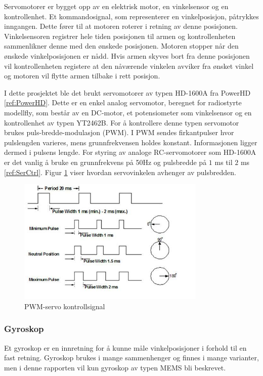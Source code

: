 Servomotorer er bygget opp av en elektrisk motor, en vinkelsensor og en kontrollenhet. Et kommandosignal, som representerer en vinkelposisjon, påtrykkes inngangen. Dette fører til at motoren roterer i retning av denne posisjonen. Vinkelsensoren registrer hele tiden posisjonen til armen og kontrollenheten sammenlikner denne med den ønskede posisjonen. Motoren stopper når den ønskede vinkelposisjonen er nådd. Hvis armen skyves bort fra denne posisjonen vil kontrollenheten registere at den nåværende vinkelen avviker fra ønsket vinkel og motoren vil flytte armen tilbake i rett posisjon.

I dette prosjektet ble det brukt servomotorer av typen HD-1600A fra PowerHD \ref{ref:PowerHD}. Dette er en enkel analog servomotor, beregnet for radiostyrte modellfly, som består av en DC-motor, et potensiometer som vinkelsensor og en kontrollenhet av typen YT2462B. For å kontrollere denne typen servomotor brukes puls-bredde-modulasjon (PWM). I PWM sendes firkantpulser hvor pulslengden varieres, mens grunnfrekvensen holdes konstant. Informasjonen ligger dermed i pulsens lengde. For styring av analoge RC-servomotorer som HD-1600A er det vanlig å bruke en grunnfrekvens på 50Hz og pulsbredde på $1$ ms til $2$ ms \ref{ref:SerCtrl}. Figur \ref{fig:PWM} viser hvordan servovinkelen avhenger av pulsbredden.

\begin{figure}[H]
\centering
\includegraphics[width=0.8\textwidth]{img/pwm_servo.jpg}
\caption{PWM-servo kontrollsignal}
\label{fig:PWM}
\end{figure}   

\subsubsection{Gyroskop}

Et gyroskop er en innretning for å kunne måle vinkelposisjoner i forhold til en fast retning. Gyroskop brukes i mange sammenhenger og finnes i mange varianter, men i denne rapporten vil kun gyroskop av typen MEMS bli beskrevet. 

